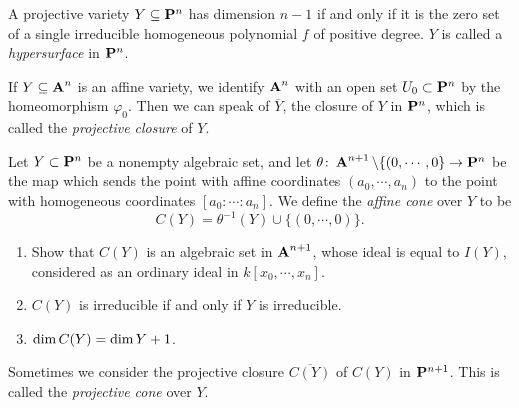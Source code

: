 \documentclass[10pt]{amsart}
\begin{document}
\begin{exercise}[2.8]
    A projective variety $Y \subseteq \bbP^n$ has dimension $n-1$ if
    and only if it is the zero set of a single irreducible homogeneous polynomial
    $f$ of positive degree. $Y$ is called a \emph{hypersurface} in $\bbP^n$.   
\end{exercise}

\begin{solution}
    
\end{solution}

\begin{exercise}[2.9]
    If $Y \subseteq \aa^n$ is an affine variety, we identify $\aa^n$ with an open
    set $U_0 \subset \bbP^n$ by the homeomorphism $\varphi_0$. Then we can speak of
    $\overline{Y}$, the closure of $Y$ in $\bbP^n$, which is called the
    \emph{projective closure} of $Y$. 
\end{exercise}

\begin{solution}
    
\end{solution}

\begin{exercise}[2.10]
    Let $Y \subset \bbP^n$ be a nonempty algebraic set, and let $\theta\colon
    \aa^{n+1} \setminus \{(0,\cdots,0\} \to \bbP^n$ be the map which sends the
    point with affine coordinates $(a_0, \cdots, a_n)$ to the point with
    homogeneous coordinates $[a_0 :\cdots: a_n]$. We define the \emph{affine cone}
    over $Y$ to be $$C(Y) = \theta^{-1}(Y) \cup \{(0,\cdots, 0)\}.$$ 
    \begin{enumerate}
        \item Show that $C(Y)$ is an algebraic set in $\aa^{n+1}$, whose ideal is equal to $I(Y)$, considered as an ordinary ideal in $k[x_0, \cdots, x_n]$. 
        \item $C(Y)$ is irreducible if and only if $Y$ is irreducible. 
        \item $\Dim C(Y) = \Dim Y +1$.
    \end{enumerate}
    Sometimes we consider the projective closure $\overline{C(Y)}$ of $C(Y)$ in
    $\bbP^{n+1}$. This is called the \emph{projective cone} over $Y$.
\end{exercise}

\begin{solution}
    
\end{solution}
\end{document}
